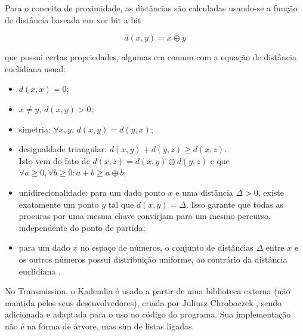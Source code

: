 Para o conceito de proximidade, as distâncias são calculadas usando-se a função de
distância baseada em \gls{xor} bit a bit

\begin{equation*}
    d(x,y) = x \oplus y
\end{equation*}

que possui certas propriedades, algumas em comum com a equação de distância euclidiana
usual:

\begin{itemize}
    \item $d(x,x) = 0$;
    \item $x \neq y$, $d(x,y) > 0$;
    \item simetria: $\forall x,y$, $d(x,y) = d(y,x)$;
    \item desigualdade triangular: $d(x,y) + d(y,z) \geq d(x,z)$. \\
        Isto vem do fato de $d(x,z) = d(x,y) \oplus d(y,z)$ e que $\forall a \geq 0,
        \forall b \geq 0 : a + b \geq a \oplus b$;
    \item unidirecionalidade: para um dado ponto $x$ e uma distância $\Delta > 0$,
        existe exatamente um ponto $y$ tal que $d(x,y) = \Delta$. Isso garante que todas
        as procuras por uma mesma chave convirjam para um mesmo percurso, independente
        do ponto de partida;
    \item para um dado $x$ no espaço de números, o conjunto de distâncias $\Delta$ entre
        $x$ e os outros números possui distribuição uniforme, ao contrário da distância
        euclidiana \cite{bittorrentcom:dht}.
\end{itemize}

No Transmission, o Kademlia é usado a partir de uma biblioteca externa (não mantida
pelos seus desenvolvedores), criada por Juliusz Chroboczek \cite{repo:dht-c}, sendo
adicionada e adaptada para o uso no código do programa. Sua implementação não é na forma
de árvore, mas sim de listas ligadas.

